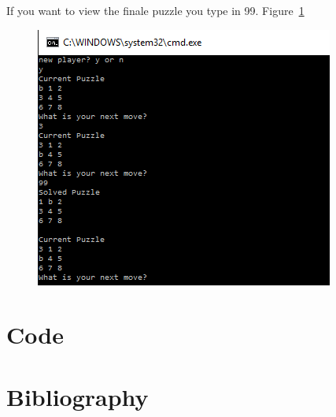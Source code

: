 \documentclass[10pt]{article}
\begin{document}
If you want to view the finale puzzle you type in 99. Figure~\ref{prent7}
\begin{figure}
\centering
\includegraphics[scale=0.8]{./Prente/prent7.png}
\caption{}
\label{prent7}
\end{figure}

\section{Code}
 \begin{tiny}
 
   \end{tiny}
   \section{Bibliography}
\end{document}
